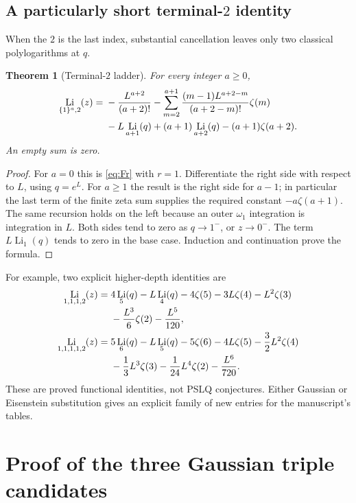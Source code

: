 \documentclass[11pt]{article}
\numberwithin{equation}{section}
\newtheorem{theorem}{Theorem}[section]
\theoremstyle{definition}\newtheorem{definition}[theorem]{Definition}
\theoremstyle{remark}\newtheorem{remark}[theorem]{Remark}
\DeclareMathOperator{\Li}{Li}
\newcommand{\ones}[1]{\{1\}^{#1}}
\begin{document}
\subsection{A particularly short \texorpdfstring{terminal-$2$}{terminal-2} identity}
When the $2$ is the last index, substantial cancellation leaves only two
classical polylogarithms at $q$.

\begin{theorem}[Terminal-$2$ ladder]\label{thm:terminal}
For every integer $a\ge0$,
\begin{align}
\Li_{\ones a,2}(z)
={}&-\frac{L^{a+2}}{(a+2)!}
 -\sum_{m=2}^{a+1}\frac{(m-1)L^{a+2-m}}{(a+2-m)!}\zeta(m)\notag\\
 &-L\Li_{a+1}(q)+(a+1)\Li_{a+2}(q)
 -(a+1)\zeta(a+2).\label{eq:terminal}
\end{align}
An empty sum is zero.
\end{theorem}
\begin{proof}
For $a=0$ this is \eqref{eq:Fr} with $r=1$.
Differentiate the right side with respect to $L$, using $q=e^L$.
For $a\ge1$ the result is the right side for $a-1$; in particular the
last term of the finite zeta sum supplies the required constant
$-a\zeta(a+1)$. The same recursion holds on the left because an outer
$\omega_1$ integration is integration in $L$.
Both sides tend to zero as $q\to1^-$, or $z\to0^-$.
The term $L\Li_1(q)$ tends to zero in the base case.
Induction and continuation prove the formula.
\end{proof}

For example, two explicit higher-depth identities are
\begin{align}
\Li_{1,1,1,2}(z)
={}&4\Li_5(q)-L\Li_4(q)-4\zeta(5)-3L\zeta(4)
-L^2\zeta(3)\notag\\[-2pt]
&-\frac{L^3}{6}\zeta(2)-\frac{L^5}{120},\label{eq:new5}\\
\Li_{1,1,1,1,2}(z)
={}&5\Li_6(q)-L\Li_5(q)-5\zeta(6)-4L\zeta(5)
-\frac32L^2\zeta(4)\notag\\[-2pt]
&-\frac13L^3\zeta(3)-\frac1{24}L^4\zeta(2)-\frac{L^6}{720}.
\label{eq:new6}
\end{align}
These are proved functional identities, not PSLQ conjectures. Either
Gaussian or Eisenstein substitution gives an explicit family of new
entries for the manuscript's tables.

\section{Proof of the three Gaussian triple candidates}
\end{document}
